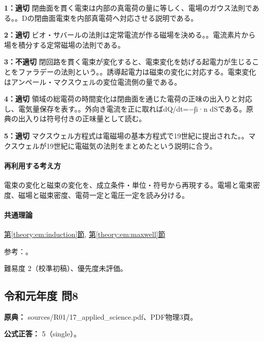 \noindent\textbf{1：適切} 閉曲面を貫く電束は内部の真電荷の量に等しく、電場のガウス法則である。。Dの閉曲面電束を内部真電荷へ対応させる説明である。\par

\noindent\textbf{2：適切} ビオ・サバールの法則は定常電流が作る磁場を決める。。電流素片から場を積分する定常磁場の法則である。\par

\noindent\textbf{3：不適切} 閉回路を貫く電束が変化すると、電束変化を妨げる起電力が生じることをファラデーの法則という。。誘導起電力は磁束の変化に対応する。電束変化はアンペール・マクスウェルの変位電流側の量である。\par

\noindent\textbf{4：適切} 領域の総電荷の時間変化は閉曲面を通じた電荷の正味の出入りと対応し、電気量保存を表す。。外向き電流を正に取ればdQ/dt=−∫i·n dSである。原典の出入りは符号付きの正味量として読む。\par

\noindent\textbf{5：適切} マクスウェル方程式は電磁場の基本方程式で19世紀に提出された。。マクスウェルが19世紀に電磁気の法則をまとめたという説明に合う。\par

\paragraph{再利用する考え方} 電束の変化と磁束の変化を、成立条件・単位・符号から再現する。電場と電束密度、磁場と磁束密度、電荷一定と電圧一定を読み分ける。

\paragraph{共通理論} \hyperref[theory:em:induction]{第\ref*{theory:em:induction}節}, \hyperref[theory:em:maxwell]{第\ref*{theory:em:maxwell}節}

\par 参考：\cite{mit_em10,mit_em13}。

\par 難易度 2（校準初稿）、優先度未評価。

\subsection{令和元年度 問8}
\label{q:r01-reg-applied-08}

\noindent\textbf{原典：} sources/R01/17\_applied\_science.pdf、PDF物理3頁。

\textbf{公式正答：} 5（single）。

